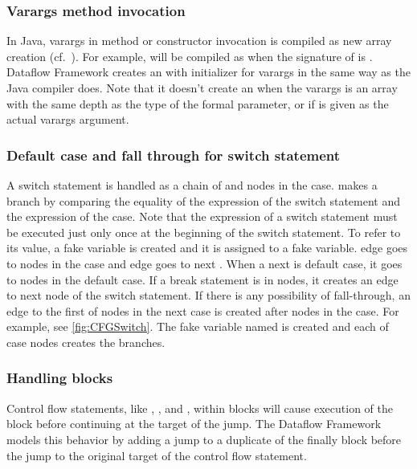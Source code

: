 \subsubsection{Varargs method invocation}
\label{sec:varargs}
In Java, varargs in method or constructor invocation is compiled
as new array creation (cf.\ ). For example,
 will be compiled as 
when the signature of  is . Dataflow
Framework creates an  with initializer for varargs
in the same way as the Java compiler does.
Note that it doesn't create an 
when the varargs is an array with the same depth as the type of
the formal parameter, or if  is given as the actual varargs argument.

\subsubsection{Default case and fall through for switch statement}
\label{sec:default-switch}
A switch statement is handled as a chain of  and nodes in
the case.  makes a branch by comparing the equality of
the expression of the switch statement and the expression of the case.
Note that the expression of a switch statement must be executed just only
once at the beginning of the switch statement. To refer to its value, a fake variable
is created and it is assigned to a fake variable. 
edge goes to nodes in the case and  edge goes to next
. When a next is default case, it goes to nodes in the default
case. If a break statement is in nodes, it creates an edge to next node of
the switch statement. If there is any possibility of fall-through, an edge
to the first of nodes in the next case is created after nodes in the case.
For example, see \autoref{fig:CFGSwitch}. The fake variable named 
is created and each of case nodes creates the branches.


\subsubsection{Handling  blocks}
\label{sec:try-finally}

Control flow statements, like , , and ,
within  blocks will cause execution of the  block before
continuing at the target of the jump. The Dataflow Framework models this
behavior by adding a jump to a duplicate of the finally block before the
jump to the original target of the control flow statement.


